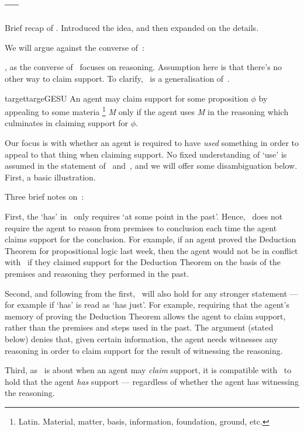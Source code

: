 \subsection{\ESU{} --- \ESU{-}}
\label{sec:esu}

\begin{note}
  Brief recap of \USE{}.
  Introduced the idea, and then expanded on the details.
\end{note}

\begin{note}[Focus]
  We will argue against the converse of~\USE{}:

  \targetESU*

  \ESU{}, as the converse of~\USE{} focuses on reasoning.
  {
    \color{red}
    Assumption here is that there's no other way to claim support.
  }
  To clarify,~\gESU{} is a generalisation of~\ESU{}.


  \begin{restatable}[\gESU{}]{target}{targeGESU}\label{denied-claim}
    An agent may claim support for some proposition \(\phi\) by appealing to some materia\nolinebreak
    \footnote{Latin.
      Material, matter, basis, information, foundation, ground, etc.
    }
    \emph{M} only if the agent uses \emph{M} in the reasoning which culminates in claiming support for \(\phi\).
  \end{restatable}
  Our focus is with whether an agent is required to have \emph{used} something in order to appeal to that thing when claiming support.
  No fixed understanding of `use' is assumed in the statement of~\ESU{} and~\gESU{}, and we will offer some disambiguation below.
  First, a basic illustration.
\end{note}

\begin{note}
  Three brief notes on~\ESU{}:

      First, the `has' in~\ESU{} only requires `at some point in the past'.
      Hence,~\ESU{} does not require the agent to reason from premises to conclusion each time the agent claims support for the conclusion.
      For example, if an agent proved the Deduction Theorem for propositional logic last week, then the agent would not be in conflict with~\ESU{} if they claimed support for the Deduction Theorem on the basis of the premises and reasoning they performed in the past.

      Second, and following from the first,~\ESU{} will also hold for any stronger statement --- for example if `has' is read as `has just'.
      For example, requiring that the agent's memory of proving the Deduction Theorem allows the agent to claim support, rather than the premises and steps used in the past.
      The argument (stated below) denies that, given certain information, the agent needs witnesses any reasoning in order to claim support for the result of witnessing the reasoning.

      Third, as~\ESU{} is about when an agent may \emph{claim} support, it is compatible with~\ESU{} to hold that the agent \emph{has} support --- regardless of whether the agent has witnessing the reasoning.
\end{note}

